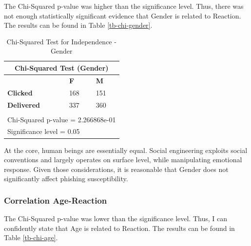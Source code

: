 \documentclass[a4paper]{article}
\begin{document}
The Chi-Squared p-value was higher than the significance level. Thus, there was not enough statistically significant evidence that Gender is related to Reaction. The results can be found in Table \ref{tb-chi-gender}.

\bigskip

\begingroup
\renewcommand{\arraystretch}{1.25}
\begin{table}[ht]
\begin{center}
    \begin{tabular}{ | l | l | l | }
    \hline
    \multicolumn{3}{|c|}{Chi-Squared Test (Gender)} \\ \hline
    \textbf{} & \textbf{F} & \textbf{M} \\
    \hline
    \textbf{Clicked} & 168 & 151 \\ \hline
    \textbf{Delivered} & 337 & 360 \\ \hline
    \multicolumn{3}{l}{} \\ \hline
    \multicolumn{3}{|l|}{Chi-Squared p-value = 2.266868e-01} \\ \multicolumn{3}{|l|}{Significance level = 0.05} \\
    \hline
    \end{tabular}
\end{center}
\caption{Chi-Squared Test for Independence - Gender}
\label{tb-chi-gender}
\label{tb-lit8}
\end{table}

\noindent
At the core, human beings are essentially equal. Social engineering exploits social conventions and largely operates on surface level, while manipulating emotional response. Given those considerations, it is reasonable that Gender does not significantly affect phishing susceptibility.

\subsubsection{Correlation Age-Reaction}


The Chi-Squared p-value was lower than the significance level. Thus, I can confidently state that Age is related to Reaction. The results can be found in Table \ref{tb-chi-age}.

\bigskip
\end{document}
